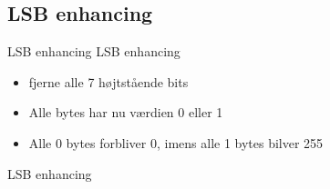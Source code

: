 \subsection{LSB enhancing}
\begin{frame}{LSB enhancing}
	LSB enhancing
	\begin{itemize}
		\item fjerne alle 7 højtstående bits
		\item Alle bytes har nu værdien 0 eller 1
		\item Alle 0 bytes forbliver 0, imens alle 1 bytes bilver 255
	\end{itemize}
\end{frame}

\begin{frame}{LSB enhancing}
\begin{figure}
\centering
{}
\end{figure}
\end{frame}

